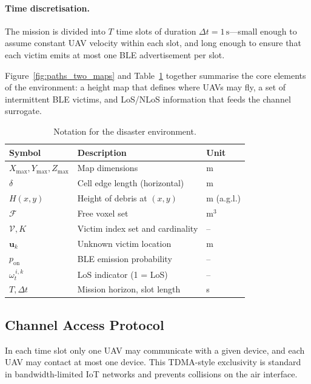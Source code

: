 \documentclass[drones,article,accept,pdftex,moreauthors]{Definitions/mdpi}
\begin{document}
\paragraph{Time discretisation.}
The mission is divided into $T$ time slots of duration $\Delta t = 1\,\mathrm{s}$—small enough
to assume constant UAV velocity within each slot, and long enough to ensure that each
victim emits at most one BLE advertisement per slot.


Figure~\ref{fig:paths_two_maps} and Table~\ref{tab:not} together summarise the core
elements of the environment: a height map that defines where UAVs may fly, a set of
intermittent BLE victims, and LoS/NLoS information that feeds the channel surrogate.

\begin{table}[H]
\caption{Notation for the disaster environment.}
\label{tab:not}
\centering
\begin{tabularx}{\textwidth}{@{}lll@{}}
\toprule
\textbf{Symbol} & \textbf{Description} & \textbf{Unit} \\
\midrule
$X_{\max},Y_{\max},Z_{\max}$ & Map dimensions & m \\
$\delta$ & Cell edge length (horizontal) & m \\
$H(x,y)$ & Height of debris at $(x,y)$ & m (a.g.l.) \\
$\mathcal F$ & Free voxel set & m$^{3}$ \\
$\mathcal V, K$ & Victim index set and cardinality & – \\
$\mathbf u_k$ & Unknown victim location & m \\
$p_{\mathrm{on}}$ & BLE emission probability & – \\
$\omega_t^{\,i,k}$ & LoS indicator (1 = LoS) & – \\
$T, \Delta t$ & Mission horizon, slot length & s \\
\bottomrule
\end{tabularx}
\end{table}

\subsection{Channel Access Protocol}\label{sec:access}

In each time slot only one UAV may communicate with a given device, and each UAV
may contact at most one device. This TDMA-style exclusivity is standard in
bandwidth-limited IoT networks and prevents collisions on the air interface.
\end{document}
